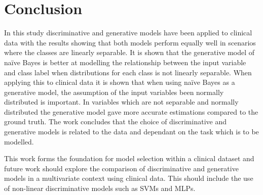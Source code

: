\documentclass[a4paper,UKenglish]{oasics-v2016}
\begin{document}
\section{Conclusion}
In this study discriminative and generative models have been applied to clinical data with the results showing that both models perform equally well in scenarios where the classes are linearly separable. It is shown that the generative model of naïve Bayes is better at modelling the relationship between the input variable and class label when distributions for each class is not linearly separable. When applying this to clinical data it is shown that when using naïve Bayes as a generative model, the assumption of the input variables been normally distributed is important. In variables which are not separable and normally distributed the generative model gave more accurate estimations compared to the ground truth. The work concludes that the choice of discriminative and generative models is related to the data and dependant on the task which is to be modelled.

This work forms the foundation for model selection within a clinical dataset and future work should explore the comparison of discriminative and generative models in a multivariate context using clinical data. This should include the use of non-linear discriminative models such as SVMs and MLPs.





\end{document}
